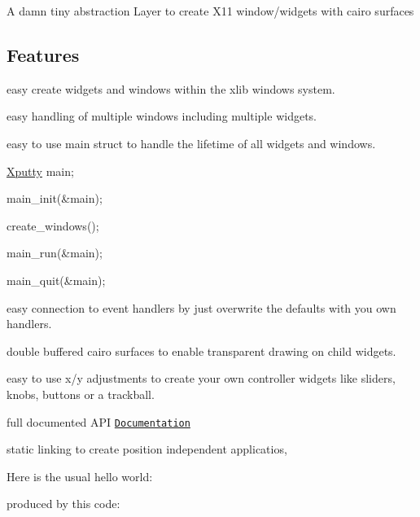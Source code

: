 A damn tiny abstraction Layer to create X11 window/widgets with cairo surfaces

\subsection*{Features}


\begin{DoxyItemize}
\item easy create widgets and windows within the xlib windows system.
\item easy handling of multiple windows including multiple widgets.
\item easy to use main struct to handle the lifetime of all widgets and windows.
\begin{DoxyItemize}
\item \hyperlink{structXputty}{Xputty} main;
\item main\+\_\+init(\&main);
\item create\+\_\+windows();
\item main\+\_\+run(\&main);
\item main\+\_\+quit(\&main);
\end{DoxyItemize}
\item easy connection to event handlers by just overwrite the defaults with you own handlers.
\item double buffered cairo surfaces to enable transparent drawing on child widgets.
\item easy to use x/y adjustments to create your own controller widgets like sliders, knobs, buttons or a trackball.
\item full documented A\+PI \href{https://brummer10.github.io/Xputty/html/index.html}{\tt Documentation}
\item static linking to create position independent applicatios,
\end{DoxyItemize}

Here is the usual hello world\+:



produced by this code\+:


